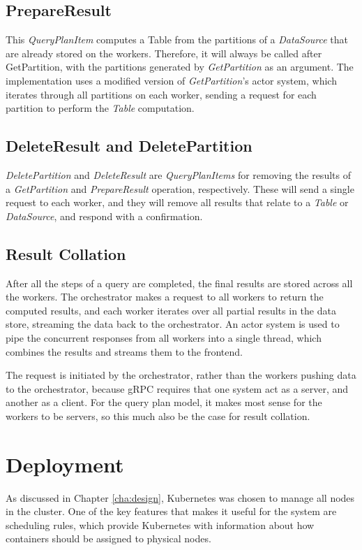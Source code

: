 \subsection{PrepareResult}
This \textit{QueryPlanItem} computes a Table from the partitions of a \textit{DataSource} that are already stored on the workers. Therefore, it will always be called after GetPartition, with the partitions generated by \textit{GetPartition} as an argument. The implementation uses a modified version of \textit{GetPartition}'s actor system, which iterates through all partitions on each worker, sending a request for each partition to perform the \textit{Table} computation.

\subsection{DeleteResult and DeletePartition}

\textit{DeletePartition} and \textit{DeleteResult} are \textit{QueryPlanItems} for removing the results of a \textit{GetPartition} and \textit{PrepareResult} operation, respectively. These will send a single request to each worker, and they will remove all results that relate to a \textit{Table} or \textit{DataSource}, and respond with a confirmation.

\subsection{Result Collation}
After all the steps of a query are completed, the final results are stored across all the workers. The orchestrator makes a request to all workers to return the computed results, and each worker iterates over all partial results in the data store, streaming the data back to the orchestrator. An actor system is used to pipe the concurrent responses from all workers into a single thread, which combines the results and streams them to the frontend. 

The request is initiated by the orchestrator, rather than the workers pushing data to the orchestrator, because gRPC requires that one system act as a server, and another as a client. For the query plan model, it makes most sense for the workers to be servers, so this much also be the case for result collation.

\section{Deployment}
As discussed in Chapter \ref{cha:design}, Kubernetes was chosen to manage all nodes in the cluster. One of the key features that makes it useful for the system are scheduling rules, which provide Kubernetes with information about how containers should be assigned to physical nodes.

